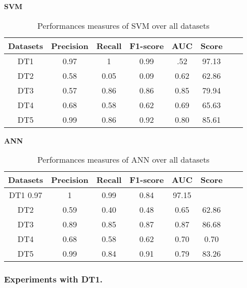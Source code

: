 \begin{center}
\textbf{SVM}

\end{center}
\begin{table}[!ht]
\centering
\begin{tabular}{*{6}{c}l r}
  \toprule
  \textbf{Datasets} & \textbf{Precision} & \textbf{Recall} & \textbf{F1-score}&\textbf{AUC} &\textbf{Score}\\
   \midrule
  DT1 &0.97 &1   &0.99 &.52 &97.13 \\
  DT2 &0.58  &0.05   & 0.09&0.62&62.86\\
  DT3 &0.57 & 0.86&0.86&0.85&79.94\\
  DT4 & 0.68&0.58&0.62&0.69&65.63\\
  DT5 &0.99 &0.86&0.92&0.80&85.61\\
    \bottomrule
\end{tabular}
\caption{Performances measures of SVM over all datasets}\label{perf-measure-dt1}
\end{table}
\begin{center}
\textbf{ANN}
\end{center}
\begin{table}[!ht]
\centering
\begin{tabular}{*{6}{c}l r}
  \toprule
  \textbf{Datasets} & \textbf{Precision} & \textbf{Recall} & \textbf{F1-score}&\textbf{AUC} &\textbf{Score}\\
   \midrule
  DT1 0.97&1 &0.99   &0.84 &97.15  \\
  DT2 &0.59  &0.40   &0.48&0.65&62.86 \\
  DT3 &0.89 &0.85 &0.87&0.87&86.68\\
  DT4 &0.68 &0.58&0.62&0.70&0.70\\
  DT5 &0.99 &0.84&0.91&0.79&83.26\\ 
    \bottomrule
\end{tabular}
\caption{Performances measures of ANN over all datasets}\label{perf-measure-dt1}
\end{table}

\subsubsection*{\bf Experiments with DT1.}
